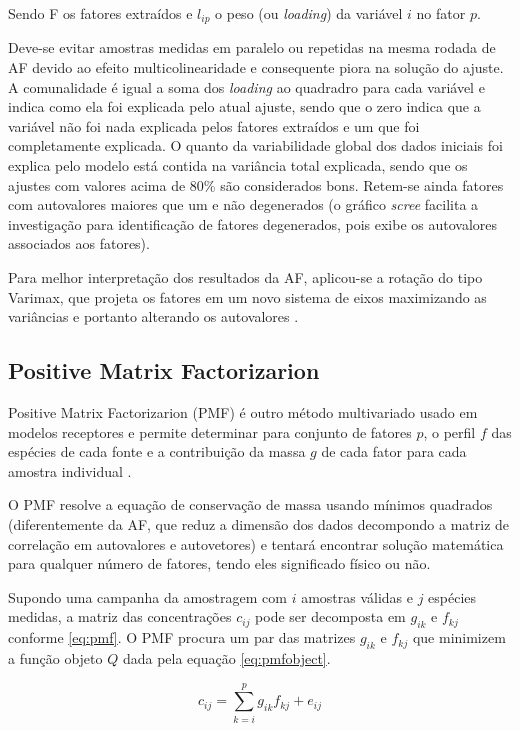 Sendo F os fatores extraídos e $l_{ip}$ o peso (ou \textit{loading})
da variável $i$ no fator $p$.

Deve-se evitar amostras medidas em paralelo ou repetidas na mesma rodada de AF 
devido ao efeito multicolinearidade e consequente piora na solução do ajuste.  
A comunalidade é igual a soma dos \textit{loading} ao quadradro 
para cada variável e indica como ela foi explicada pelo atual ajuste, 
sendo que o zero indica que a variável não foi nada explicada pelos fatores 
extraídos e um que foi completamente explicada. 
O quanto da variabilidade global dos dados iniciais foi explica pelo modelo está 
contida na variância total explicada, sendo que os ajustes com valores 
acima de 80\% são considerados bons. 
Retem-se ainda fatores com autovalores maiores que um e não degenerados 
(o gráfico \textit{scree} facilita a investigação para identificação de fatores 
degenerados, pois exibe os autovalores associados aos fatores). 

Para melhor interpretação dos resultados da AF, aplicou-se a rotação do tipo 
Varimax, que projeta os fatores em um novo sistema de eixos maximizando 
as variâncias e portanto alterando os autovalores \citep{kaiser1958}.

\subsection{Positive Matrix Factorizarion}

Positive Matrix Factorizarion (PMF) é outro método multivariado usado
em modelos receptores e permite determinar para conjunto de fatores $p$, 
o perfil $f$ das espécies de cada fonte e a contribuição da massa $g$ 
de cada fator para cada amostra individual \citep{norris2014}. 

O PMF resolve a equação de conservação de massa usando mínimos 
quadrados (diferentemente da AF, que reduz a dimensão dos 
dados decompondo a matriz de correlação em autovalores e autovetores) e 
tentará encontrar solução matemática para qualquer número de fatores, tendo
eles significado físico ou não. 

Supondo uma campanha da amostragem com $i$ amostras válidas e 
$j$ espécies medidas, a matriz das concentrações $c_{ij}$ 
pode ser decomposta em $g_{ik}$ e $f_{kj}$ conforme \ref{eq:pmf}. 
O PMF procura um par das matrizes $g_{ik}$ e $f_{kj}$ que
minimizem a função objeto $Q$ dada pela equação \ref{eq:pmfobject}. 

\begin{equation}
  c_{ij} = \sum_{k=i}^p g_{ik}f_{kj} + e_{ij}
  \label{eq:pmf}
\end{equation}

